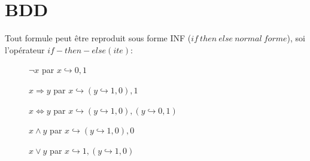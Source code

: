 \section{BDD}
Tout formule peut être reproduit sous forme INF ($if\ then\ else\ normal\ forme$), soi l'opérateur $if-then-else (ite)$:
\begin{description}
\item[] $\neg x$ par $x \hookrightarrow 0,1$
\item[] $x \Rightarrow y$ par $x \hookrightarrow (y \hookrightarrow 1, 0), 1$
\item[] $x \Leftrightarrow y$ par $x \hookrightarrow (y \hookrightarrow 1,0), (y \hookrightarrow 0,1)$
\item[] $x \wedge y$ par  $x \hookrightarrow (y \hookrightarrow 1, 0), 0$
\item[] $x \vee y$ par $x \hookrightarrow 1, (y \hookrightarrow 1,0)$
\end{description}


